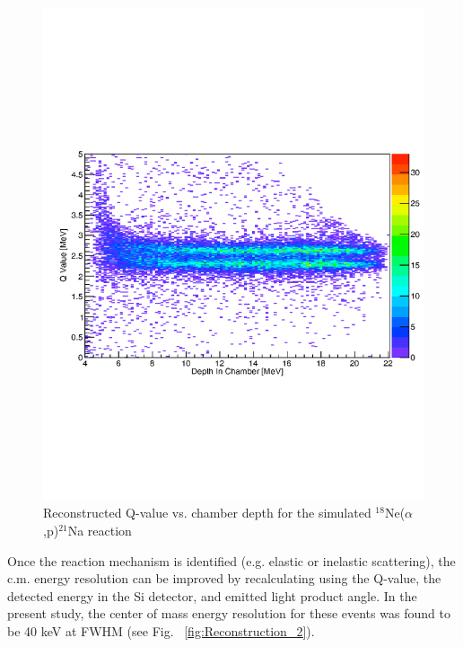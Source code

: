 \documentclass[final,number,sort&compress,5p,times,twocolumn]{elsarticle}
\begin{document}
\begin{figure}[hbt!]
    \centering
     \includegraphics[width=1.0\columnwidth]{Figs/Reconstruction_1}
     \caption{Reconstructed Q-value vs. chamber depth for the simulated $^{18}$Ne($\alpha$,p)$^{21}$Na reaction}
     \label{fig:Reconstruction_1}
   \end{figure}


Once the reaction mechanism is identified (e.g. elastic or inelastic scattering), the c.m. energy resolution can be improved by recalculating using the Q-value, the detected energy in the Si detector, and emitted light product angle. In the present study, the center of mass energy resolution for these events was found to be 40 keV at FWHM (see Fig. ~\ref{fig:Reconstruction_2}).
		
\end{document}
